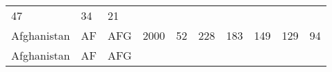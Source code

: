 \documentclass[]{article}
\begin{document}
\begin{longtable}[]{@{}lllrrrrrrr@{}}
\begin{minipage}[t]{0.09\columnwidth}
47\strut
\end{minipage} & \begin{minipage}[t]{0.09\columnwidth}\raggedleft\strut
34\strut
\end{minipage} & \begin{minipage}[t]{0.09\columnwidth}\raggedleft\strut
21\strut
\end{minipage}\tabularnewline
\begin{minipage}[t]{0.08\columnwidth}\raggedright\strut
Afghanistan\strut
\end{minipage} & \begin{minipage}[t]{0.04\columnwidth}\raggedright\strut
AF\strut
\end{minipage} & \begin{minipage}[t]{0.04\columnwidth}\raggedright\strut
AFG\strut
\end{minipage} & \begin{minipage}[t]{0.04\columnwidth}\raggedleft\strut
2000\strut
\end{minipage} & \begin{minipage}[t]{0.08\columnwidth}\raggedleft\strut
52\strut
\end{minipage} & \begin{minipage}[t]{0.09\columnwidth}\raggedleft\strut
228\strut
\end{minipage} & \begin{minipage}[t]{0.09\columnwidth}\raggedleft\strut
183\strut
\end{minipage} & \begin{minipage}[t]{0.09\columnwidth}\raggedleft\strut
149\strut
\end{minipage} & \begin{minipage}[t]{0.09\columnwidth}\raggedleft\strut
129\strut
\end{minipage} & \begin{minipage}[t]{0.09\columnwidth}\raggedleft\strut
94\strut
\end{minipage}\tabularnewline
\begin{minipage}[t]{0.08\columnwidth}\raggedright\strut
Afghanistan\strut
\end{minipage} & \begin{minipage}[t]{0.04\columnwidth}\raggedright\strut
AF\strut
\end{minipage} & \begin{minipage}[t]{0.04\columnwidth}\raggedright\strut
AFG\strut
\end{minipage} & \begin{minipage}[t]{0.04\columnwidth}\raggedleft\strut

\end{minipage}
\end{longtable}
\end{document}
